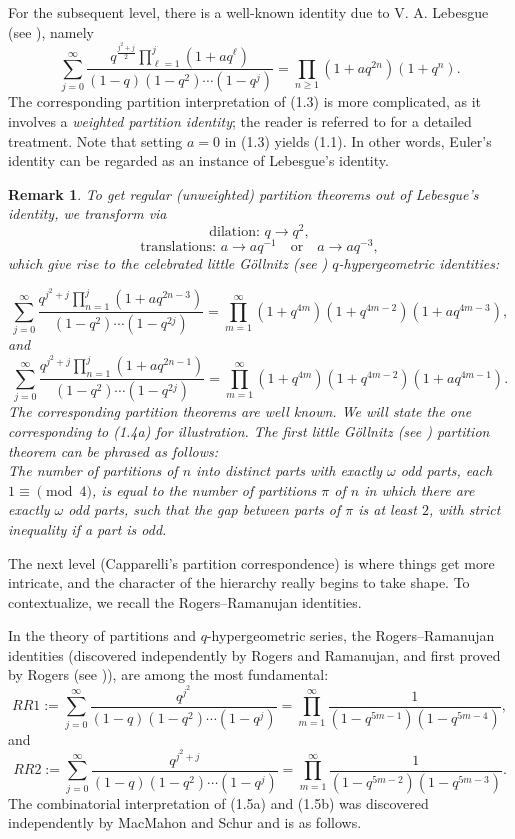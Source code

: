 \documentclass[12pt,a4paper]{amsart}
\newtheorem{remark}{Remark}
\theoremstyle{definition}
\theoremstyle{notation}
\theoremstyle{corollary}
\begin{document}
For the subsequent level, there is a well-known identity due to V. A. Lebesgue (see \cite{GEA}), namely
\[\sum^{\infty}_{j=0}\frac{q^{\frac{j^2+j}{2}}\prod_{\ell=1}^j(1+aq^{\ell})}{(1-q)(1-q^2)\cdots(1-q^j)}=\prod_{n\geq1}(1+aq^{2n})(1+q^{n}).\tag{1.3}\]
The corresponding partition interpretation of (1.3) is more complicated, as it involves a \textit{weighted partition identity}; the reader is referred to \cite{KABG93} for a detailed treatment. Note that setting $a=0$ in (1.3) yields (1.1). In other words, Euler's identity can be regarded as an instance of Lebesgue's identity.

\begin{remark}

To get regular (unweighted) partition theorems out of Lebesgue’s identity, we transform via  
 \[\text{dilation: }q\to q^2,\]
 \[\text{translations: }a\to aq^{-1}\quad\text{or} \quad  a\to aq^{-3},\] which give rise to the celebrated little G\"ollnitz (see \cite{YAKA25,GEA,HG67})  $q$-hypergeometric identities:

\[
\sum^{\infty}_{j=0}\frac{q^{j^2+j}\prod_{n=1}^j(1+aq^{2n-3})}{(1-q^2)\cdots(1-q^{2j})}
=\prod^{\infty}_{m=1}(1+q^{4m})(1+q^{4m-2})(1+aq^{4m-3}),\tag{1.4a}
\]
and
\[
\sum^{\infty}_{j=0}\frac{q^{j^2+j}\prod_{n=1}^j(1+aq^{2n-1})}{(1-q^2)\cdots(1-q^{2j})}
=\prod^{\infty}_{m=1}(1+q^{4m})(1+q^{4m-2})(1+aq^{4m-1}).\tag{1.4b}
\]
The corresponding partition theorems are well known. We will state the one corresponding to (1.4a) for illustration. The first little G\"ollnitz (see \cite{YAKA25,GEA,HG67}) partition theorem can be phrased as follows:\\

The number of partitions of $n$ into distinct parts with exactly $\omega$ odd parts, each $1\equiv \pmod 4$, is equal to the number of partitions $\pi$ of $n$ in which there are exactly $\omega$ odd parts, such that the gap between parts of $\pi$ is at least $2$, with strict inequality if a part is odd. 
\end{remark}


The next level (Capparelli's partition correspondence) is where things get more intricate, and the character of the hierarchy really begins to take shape. To contextualize, we recall the Rogers--Ramanujan identities.

In the theory of partitions and $q$-hypergeometric series, the Rogers--Ramanujan identities (discovered independently by Rogers and Ramanujan, and first proved by Rogers (see \cite{GEA})), are among the most fundamental: 
\[
RR1:=\sum^{\infty}_{j=0}\frac{q^{j^2}}{(1-q)(1-q^2)\cdots(1-q^j)}
=\prod^{\infty}_{m=1}\frac{1}{(1-q^{5m-1})(1-q^{5m-4})},\tag{1.5a}
\]
and
\[
RR2:=\sum^{\infty}_{j=0}\frac{q^{j^2+j}}{(1-q)(1-q^2)\cdots(1-q^j)}
=\prod^{\infty}_{m=1}\frac{1}{(1-q^{5m-2})(1-q^{5m-3})}.\tag{1.5b}
\]
The combinatorial interpretation of (1.5a) and (1.5b) was discovered independently by MacMahon and Schur and is as follows.\newpage
\end{document}
